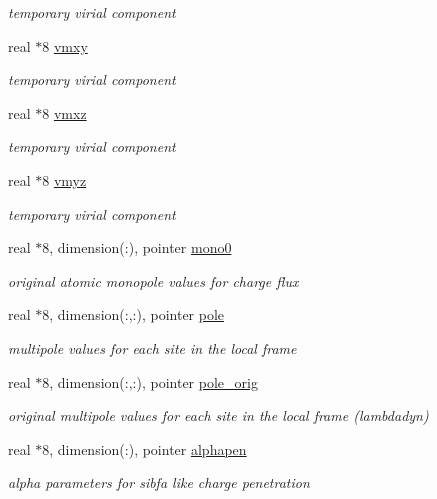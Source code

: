 \begin{DoxyCompactItemize}
\begin{DoxyCompactList}\small\item\em temporary virial component \end{DoxyCompactList}\item 
real $\ast$8 \hyperlink{classmpole_a0b4e139e326dd548da6641c550f5b9cd}{vmxy}
\begin{DoxyCompactList}\small\item\em temporary virial component \end{DoxyCompactList}\item 
real $\ast$8 \hyperlink{classmpole_ab6d3d975fb3b36405048af1afc811a8f}{vmxz}
\begin{DoxyCompactList}\small\item\em temporary virial component \end{DoxyCompactList}\item 
real $\ast$8 \hyperlink{classmpole_a2622f06370ae8e02ba34594ad55e93e0}{vmyz}
\begin{DoxyCompactList}\small\item\em temporary virial component \end{DoxyCompactList}\item 
real $\ast$8, dimension(\-:), pointer \hyperlink{classmpole_a7931c73e67f6769c759412d25e58fc58}{mono0}
\begin{DoxyCompactList}\small\item\em original atomic monopole values for charge flux \end{DoxyCompactList}\item 
real $\ast$8, dimension(\-:,\-:), pointer \hyperlink{classmpole_ab3bb649ea8ab60b38951d7ca48d75402}{pole}
\begin{DoxyCompactList}\small\item\em multipole values for each site in the local frame \end{DoxyCompactList}\item 
real $\ast$8, dimension(\-:,\-:), pointer \hyperlink{classmpole_a3079f5a8f75081a85977a93e0a98f038}{pole\-\_\-orig}
\begin{DoxyCompactList}\small\item\em original multipole values for each site in the local frame (lambdadyn) \end{DoxyCompactList}\item 
real $\ast$8, dimension(\-:), pointer \hyperlink{classmpole_a6156571b658a3a6b485563bcb7bf2ed7}{alphapen}
\begin{DoxyCompactList}\small\item\em alpha parameters for sibfa like charge penetration \end{DoxyCompactList}\item 

\end{DoxyCompactItemize}
